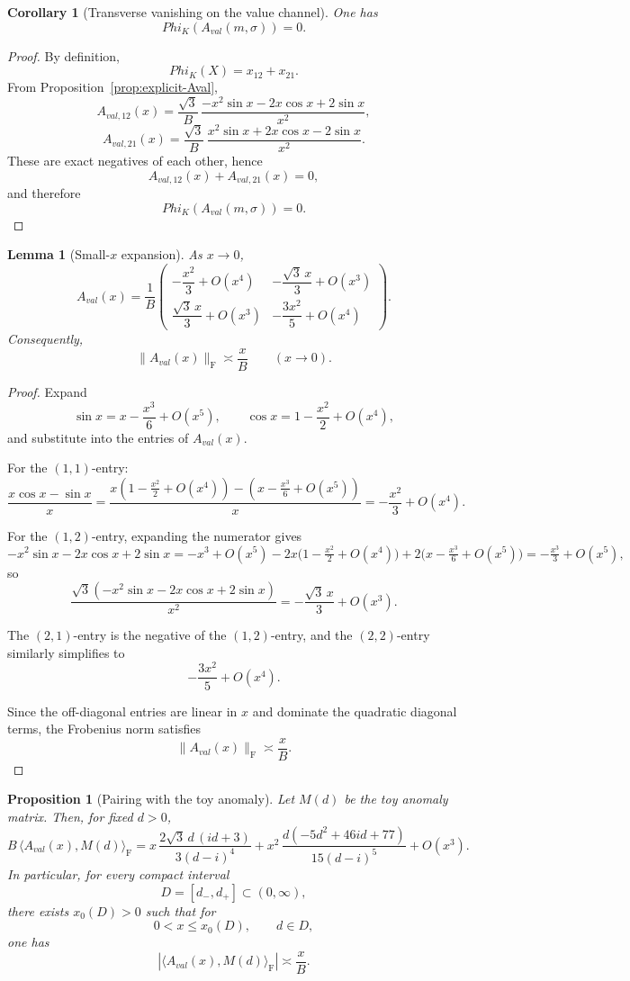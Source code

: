 \documentclass[11pt,a4paper]{amsart}
\def\Phi{Phi}%
\def\val{val}%
\theoremstyle{plain}
\newtheorem{proposition}[theorem]{Proposition}
\newtheorem{lemma}[theorem]{Lemma}
\newtheorem{corollary}[theorem]{Corollary}
\theoremstyle{definition}
\newcommand{\val}{\mathrm{val}}
\newcommand{\F}{\mathrm{F}}
\begin{document}
\begin{corollary}[Transverse vanishing on the value channel]
\label{cor:PhiK-Aval-zero}
One has
\[
\Phi_K(A_{\val}(m,\sigma))=0.
\]
\end{corollary}

\begin{proof}
By definition,
\[
\Phi_K(X)=x_{12}+x_{21}.
\]
From Proposition~\ref{prop:explicit-Aval},
\[
A_{\val,12}(x)=
\frac{\sqrt3}{B}\,
\frac{-x^2\sin x-2x\cos x+2\sin x}{x^2},
\]
\[
A_{\val,21}(x)=
\frac{\sqrt3}{B}\,
\frac{x^2\sin x+2x\cos x-2\sin x}{x^2}.
\]
These are exact negatives of each other, hence
\[
A_{\val,12}(x)+A_{\val,21}(x)=0,
\]
and therefore
\[
\Phi_K(A_{\val}(m,\sigma))=0.
\]
\end{proof}

\begin{lemma}[Small-$x$ expansion]
\label{lem:Aval-small-x}
As $x\to 0$,
\[
A_{\val}(x)=\frac1B
\begin{pmatrix}
-\dfrac{x^2}{3}+O(x^4) & -\dfrac{\sqrt3\,x}{3}+O(x^3)\\[1.2ex]
\dfrac{\sqrt3\,x}{3}+O(x^3) & -\dfrac{3x^2}{5}+O(x^4)
\end{pmatrix}.
\]
Consequently,
\[
\|A_{\val}(x)\|_\F\asymp \frac{x}{B}
\qquad (x\to 0).
\]
\end{lemma}

\begin{proof}
Expand
\[
\sin x=x-\frac{x^3}{6}+O(x^5),
\qquad
\cos x=1-\frac{x^2}{2}+O(x^4),
\]
and substitute into the entries of $A_{\val}(x)$.

For the $(1,1)$-entry:
\[
\frac{x\cos x-\sin x}{x}
=
\frac{x(1-\frac{x^2}{2}+O(x^4))-(x-\frac{x^3}{6}+O(x^5))}{x}
=
-\frac{x^2}{3}+O(x^4).
\]

For the $(1,2)$-entry, expanding the numerator gives
\[
-x^2\sin x-2x\cos x+2\sin x
=-x^3+O(x^5)-2x\bigl(1-\tfrac{x^2}{2}+O(x^4)\bigr)+2\bigl(x-\tfrac{x^3}{6}+O(x^5)\bigr)
=-\tfrac{x^3}{3}+O(x^5),
\]
so
\[
\frac{\sqrt3(-x^2\sin x-2x\cos x+2\sin x)}{x^2}
=-\frac{\sqrt3\,x}{3}+O(x^3).
\]

The $(2,1)$-entry is the negative of the $(1,2)$-entry, and the
$(2,2)$-entry similarly simplifies to
\[
-\frac{3x^2}{5}+O(x^4).
\]

Since the off-diagonal entries are linear in $x$ and dominate the quadratic
diagonal terms, the Frobenius norm satisfies
\[
\|A_{\val}(x)\|_\F\asymp \frac{x}{B}.
\]
\end{proof}

\begin{proposition}[Pairing with the toy anomaly]
\label{prop:pairing}
Let $M(d)$ be the toy anomaly matrix. Then, for fixed $d>0$,
\[
B\,\langle A_{\val}(x),M(d)\rangle_\F
=
x\,\frac{2\sqrt3\,d\,(id+3)}{3(d-i)^4}
+
x^2\,\frac{d(-5d^2+46id+77)}{15(d-i)^5}
+
O(x^3).
\]
In particular, for every compact interval
\[
D=[d_-,d_+]\subset(0,\infty),
\]
there exists $x_0(D)>0$ such that for
\[
0<x\le x_0(D),\qquad d\in D,
\]
one has
\[
|\langle A_{\val}(x),M(d)\rangle_\F|\asymp \frac{x}{B}.
\]
\end{proposition}
\end{document}
